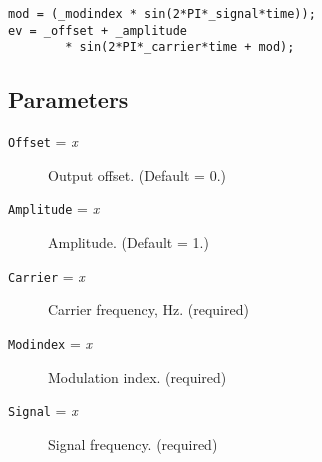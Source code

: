 \begin{verbatim}
mod = (_modindex * sin(2*PI*_signal*time));
ev = _offset + _amplitude 
        * sin(2*PI*_carrier*time + mod);
\end{verbatim}
\subsection{Parameters}

\begin{description}

\item[{\tt Offset} = {\it x}] Output offset.  (Default = 0.)

\item[{\tt Amplitude} = {\it x}] Amplitude.  (Default = 1.)

\item[{\tt Carrier} = {\it x}] Carrier frequency, Hz.  (required)

\item[{\tt Modindex} = {\it x}] Modulation index.  (required)

\item[{\tt Signal} = {\it x}] Signal frequency.  (required)

\end{description}
